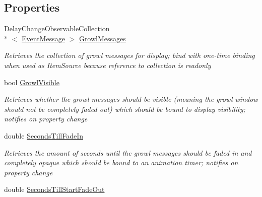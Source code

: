 \subsection*{Properties}
\begin{DoxyCompactItemize}
\item 
Delay\-Change\-Observable\-Collection\\*
$<$ \hyperlink{class_cloud_api_public_1_1_event_message_receiver_1_1_event_message}{Event\-Message} $>$ \hyperlink{class_cloud_api_public_1_1_event_message_receiver_1_1_event_message_receiver_ab56088cad1ff2316973873b561ec1018}{Growl\-Messages}
\begin{DoxyCompactList}\small\item\em Retrieves the collection of growl messages for display; bind with one-\/time binding when used as Item\-Source because reference to collection is readonly \end{DoxyCompactList}\item 
bool \hyperlink{class_cloud_api_public_1_1_event_message_receiver_1_1_event_message_receiver_a082b999afb6c8b85f4d674a75bf341bb}{Growl\-Visible}
\begin{DoxyCompactList}\small\item\em Retrieves whether the growl messages should be visible (meaning the growl window should not be completely faded out) which should be bound to display visibility; notifies on property change \end{DoxyCompactList}\item 
double \hyperlink{class_cloud_api_public_1_1_event_message_receiver_1_1_event_message_receiver_a9f93b9413622329023074e2974c5c7f1}{Seconds\-Till\-Fade\-In}
\begin{DoxyCompactList}\small\item\em Retrieves the amount of seconds until the growl messages should be faded in and completely opaque which should be bound to an animation timer; notifies on property change \end{DoxyCompactList}\item 
double \hyperlink{class_cloud_api_public_1_1_event_message_receiver_1_1_event_message_receiver_a74a4bdd5d41cae17fa41ae47900697af}{Seconds\-Till\-Start\-Fade\-Out}

\end{DoxyCompactItemize}
